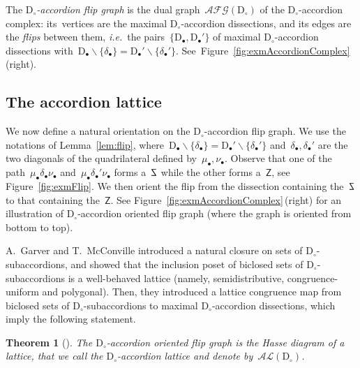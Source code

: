 \documentclass{amsart}
\newtheorem{theorem}{Theorem}%
\theoremstyle{definition}
\newcommand{\ssm}{\smallsetminus} %
\newcommand{\fref}[1]{Figure~\ref{#1}} %
\newcommand{\ie}{\textit{i.e.}~} %
\newcommand{\darkblue}{\color{darkblue}} %
\newcommand{\defn}[1]{\textsl{\darkblue #1}} %
\newcommand{\accordionLattice}{\mathcal{AL}} %
\newcommand{\accordionFlipGraph}{\mathcal{AFG}} %
\newcommand{\dissection}{\mathrm{D}} %
\newcommand{\SSS}{\reflectbox{$\mathsf{Z}$}} %
\newcommand{\ZZZ}{\mathsf{Z}} %
\begin{document}
The \defn{$\dissection_\circ$-accordion flip graph} is the dual graph~$\accordionFlipGraph(\dissection_\circ)$ of the $\dissection_\circ$-accordion complex: its~vertices are the maximal $\dissection_\circ$-accordion dissections, and its edges are the \defn{flips} between them, \ie the pairs~$\{\dissection_\bullet, \dissection_\bullet'\}$ of maximal $\dissection_\circ$-accordion dissections with~$\dissection_\bullet \ssm \{\delta_\bullet\} = \dissection_\bullet' \ssm \{\delta_\bullet'\}$. See~\mbox{\fref{fig:exmAccordionComplex}\,(right)}.


\subsection{The accordion lattice}
\label{subsec:accordionLattice}

We now define a natural orientation on the $\dissection_\circ$-accordion flip graph. We use the notations of Lemma~\ref{lem:flip}, where~$\dissection_\bullet \ssm \{\delta_\bullet\} = \dissection_\bullet' \ssm \{\delta_\bullet'\}$ and~$\delta_\bullet, \delta_\bullet'$ are the two diagonals of the quadrilateral defined by~$\mu_\bullet, \nu_\bullet$. Observe that one of the path~$\mu_\bullet \delta_\bullet \nu_\bullet$ and~$\mu_\bullet \delta_\bullet' \nu_\bullet$ forms a~$\SSS$ while the other forms a~$\ZZZ$, see \fref{fig:exmFlip}. We then orient the flip from the dissection containing the~$\SSS$ to that containing the~$\ZZZ$. See \fref{fig:exmAccordionComplex}\,(right) for an illustration of $\dissection_\circ$-accordion oriented flip graph (where the graph is oriented from bottom to top).


A.~Garver and T.~McConville introduced a natural closure on sets of $\dissection_\circ$-subaccordions, and showed that the inclusion poset of biclosed sets of $\dissection_\circ$-subaccordions is a well-behaved lattice (namely, semidistributive, congruence-uniform and polygonal). Then, they introduced a lattice congruence map from biclosed sets of $\dissection_\circ$-subaccordions to maximal $\dissection_\circ$-accordion dissections, which imply the following statement.

\begin{theorem}[\cite{GarverMcConville}]
The $\dissection_\circ$-accordion oriented flip graph is the Hasse diagram of a lattice, that we call the \defn{$\dissection_\circ$-accordion lattice} and denote by~$\accordionLattice(\dissection_\circ)$.
\end{theorem}
\end{document}
